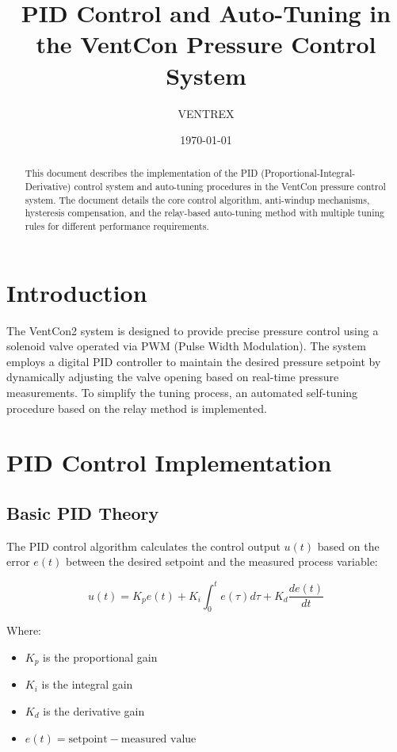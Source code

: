 \documentclass[a4paper,11pt]{article}
\title{PID Control and Auto-Tuning in the VentCon Pressure Control System}
\author{VENTREX}
\date{\today}
\begin{document}
\maketitle

\begin{abstract}
This document describes the implementation of the PID (Proportional-Integral-Derivative) control system and auto-tuning procedures in the VentCon pressure control system. The document details the core control algorithm, anti-windup mechanisms, hysteresis compensation, and the relay-based auto-tuning method with multiple tuning rules for different performance requirements.
\end{abstract}

\tableofcontents

\section{Introduction}

The VentCon2 system is designed to provide precise pressure control using a solenoid valve operated via PWM (Pulse Width Modulation). The system employs a digital PID controller to maintain the desired pressure setpoint by dynamically adjusting the valve opening based on real-time pressure measurements. To simplify the tuning process, an automated self-tuning procedure based on the relay method is implemented.

\section{PID Control Implementation}

\subsection{Basic PID Theory}

The PID control algorithm calculates the control output $u(t)$ based on the error $e(t)$ between the desired setpoint and the measured process variable\cite{wiki:pid}:

\begin{equation}
u(t) = K_p e(t) + K_i \int_{0}^{t} e(\tau) d\tau + K_d \frac{de(t)}{dt}
\end{equation}

Where:
\begin{itemize}
    \item $K_p$ is the proportional gain
    \item $K_i$ is the integral gain
    \item $K_d$ is the derivative gain
    \item $e(t) = \text{setpoint} - \text{measured value}$
\end{itemize}
\end{document}

